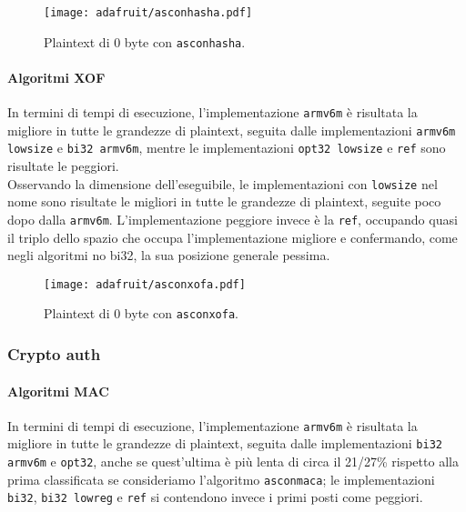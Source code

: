 \begin{figure}[H]
    \centering
    \texttt{[image: adafruit/asconhasha.pdf]}
    \caption{Plaintext di 0 byte con \texttt{asconhasha}.}
\end{figure}

\paragraph{Algoritmi XOF}

In termini di tempi di esecuzione, l'implementazione \texttt{armv6m} è risultata la migliore in tutte le grandezze di plaintext, seguita dalle implementazioni \texttt{armv6m lowsize} e \texttt{bi32 armv6m}, mentre le implementazioni \texttt{opt32 lowsize} e \texttt{ref} sono risultate le peggiori. \\

\noindent Osservando la dimensione dell'eseguibile, le implementazioni con \texttt{lowsize} nel nome sono risultate le migliori in tutte le grandezze di plaintext, seguite poco dopo dalla \texttt{armv6m}. L'implementazione peggiore invece è la \texttt{ref}, occupando quasi il triplo dello spazio che occupa l'implementazione migliore e confermando, come negli algoritmi no bi32, la sua posizione generale pessima.

\begin{figure}[H]
    \centering
    \texttt{[image: adafruit/asconxofa.pdf]}
    \caption{Plaintext di 0 byte con \texttt{asconxofa}.}
\end{figure}

\subsubsection{Crypto auth}

\paragraph{Algoritmi MAC}

In termini di tempi di esecuzione, l'implementazione \texttt{armv6m} è risultata la migliore in tutte le grandezze di plaintext, seguita dalle implementazioni \texttt{bi32 armv6m} e \texttt{opt32}, anche se quest'ultima è più lenta di circa il 21/27\% rispetto alla prima classificata se consideriamo l'algoritmo \texttt{asconmaca}; le implementazioni \texttt{bi32}, \texttt{bi32 lowreg} e \texttt{ref} si contendono invece i primi posti come peggiori. \\

